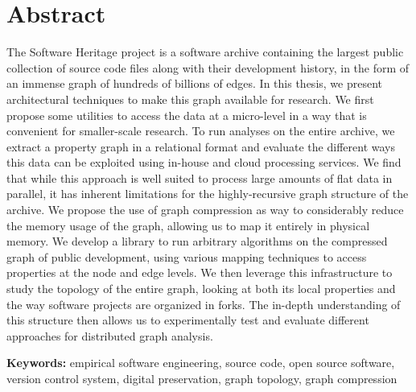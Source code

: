 \begin{minipage}[t][0.5\textheight][t]{0.96\textwidth}

\section*{Abstract}
\begin{SingleSpace}
    The Software Heritage project is a software archive containing the largest
    public collection of source code files along with their development history,
    in the form of an immense graph of hundreds of billions of edges. In this
    thesis, we present architectural techniques to make this graph available
    for research. We first propose some utilities to access the data at a
    micro-level in a way that is convenient for smaller-scale research.
    To run analyses on the entire archive, we extract a property graph in a
    relational format and evaluate the different ways this data can be
    exploited using in-house and cloud processing services.
    We find that while this approach is well suited to process large amounts of
    flat data in parallel, it has inherent limitations for the highly-recursive
    graph structure of the archive. We propose the use of graph compression as
    way to considerably reduce the memory usage of the graph, allowing us to
    map it entirely in physical memory. We develop a library to run arbitrary
    algorithms on the compressed graph of public development, using various
    mapping techniques to access properties at the node and edge levels.
    We then leverage this infrastructure to study the topology of the entire
    graph, looking at both its local properties and the way software projects
    are organized in forks. The in-depth understanding of this structure then
    allows us to experimentally test and evaluate different approaches for
    distributed graph analysis.

\vspace{3mm}

\textbf{Keywords:} empirical software engineering, source code, open source
software, version control system, digital preservation, graph topology, graph
compression

\end{SingleSpace}
\end{minipage} \\


